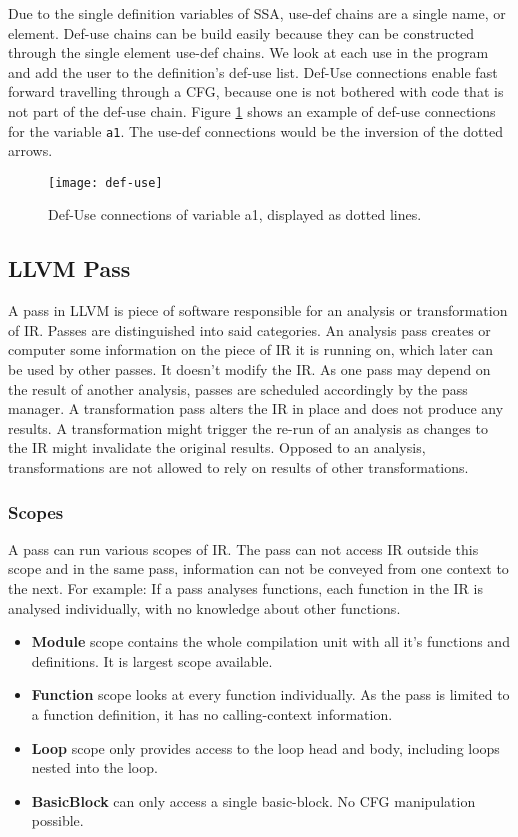 Due to the single definition variables of SSA, use-def chains are a single name, or element. Def-use chains can be build easily because they can be constructed through the single element use-def chains. We look at each use in the program and add the user to the definition's def-use list. Def-Use connections enable fast forward travelling through a CFG, because one is not bothered with code that is not part of the def-use chain. Figure \ref{def-use} shows an example of def-use connections for the variable \verb|a1|. The use-def connections would be the inversion of the dotted arrows. \cite{Rastello:2016:SCD:3002539}
\begin{figure}[t]
	\centering
	\texttt{[image: def-use]}
	\caption{Def-Use connections of variable a1, displayed as dotted lines.}
	\label{def-use}
\end{figure}

\subsection{LLVM Pass}\label{llvmpass}
A pass in LLVM is piece of software responsible for an analysis or transformation of IR. Passes are distinguished into said categories. An analysis pass creates or computer some information on the piece of IR it is running on, which later can be used by other passes. It doesn't modify the IR. As one pass may depend on the result of another analysis, passes are scheduled accordingly by the pass manager. A transformation pass alters the IR in place and does not produce any results. A transformation might trigger the re-run of an analysis as changes to the IR might invalidate the original results. Opposed to an analysis, transformations are not allowed to rely on results of other transformations. \cite{llvm-passes}

\subsubsection{Scopes}
A pass can run various scopes of IR. The pass can not access IR outside this scope and in the same pass, information can not be conveyed from one context to the next. For example: If a pass analyses functions, each function in the IR is analysed individually, with no knowledge about other functions. \cite{llvm-scopes}
\begin{itemize}
	\item \textbf{Module} scope contains the whole compilation unit with all it's functions and definitions. It is largest scope available.
	\item \textbf{Function} scope looks at every function individually. As the pass is limited to a function definition, it has no calling-context information. 
	\item \textbf{Loop} scope only provides access to the loop head and body, including loops nested into the loop.
	\item \textbf{BasicBlock} can only access a single basic-block. No CFG manipulation possible.
\end{itemize}

